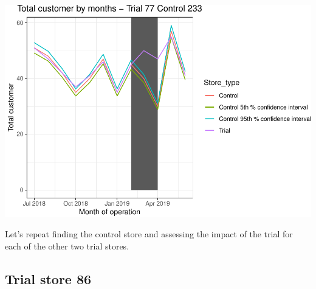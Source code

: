 \documentclass[]{article}
\begin{document}
\includegraphics{Task2_files/figure-latex/unnamed-chunk-7-1}

Let's repeat finding the control store and assessing the impact of the
trial for each of the other two trial stores.

\hypertarget{trial-store-86}{%
\subsection{Trial store 86}\label{trial-store-86}}
\end{document}
